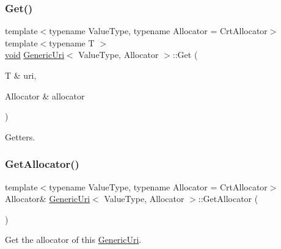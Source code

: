 \mbox{\label{classGenericUri_ae3d2e835bd683e41720379260c2f1e04}} 
\subsubsection{\texorpdfstring{Get()}{Get()}}
{\footnotesize\ttfamily template$<$typename Value\+Type, typename Allocator = Crt\+Allocator$>$ \\
template$<$typename T $>$ \\
\hyperlink{imgui__impl__opengl3__loader_8h_ac668e7cffd9e2e9cfee428b9b2f34fa7}{void} \hyperlink{classGenericUri}{Generic\+Uri}$<$ Value\+Type, Allocator $>$\+::Get (\begin{DoxyParamCaption}\item[{T \&}]{uri,  }\item[{Allocator \&}]{allocator }\end{DoxyParamCaption})\hspace{0.3cm}{\ttfamily [inline]}}



Getters. 

\mbox{\label{classGenericUri_a7dfc2c65b606611f2f19292f375c741a}} 
\subsubsection{\texorpdfstring{Get\+Allocator()}{GetAllocator()}}
{\footnotesize\ttfamily template$<$typename Value\+Type, typename Allocator = Crt\+Allocator$>$ \\
Allocator\& \hyperlink{classGenericUri}{Generic\+Uri}$<$ Value\+Type, Allocator $>$\+::Get\+Allocator (\begin{DoxyParamCaption}{ }\end{DoxyParamCaption})\hspace{0.3cm}{\ttfamily [inline]}}



Get the allocator of this \hyperlink{classGenericUri}{Generic\+Uri}. 

\mbox{\label{classGenericUri_af9b39ae6698d523c715d73fbddfcaa27}} 
